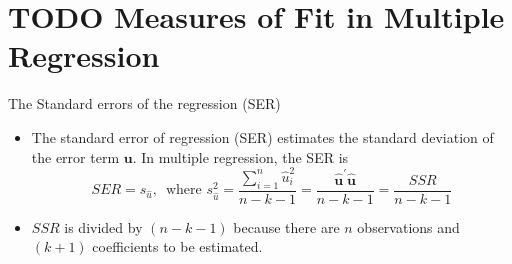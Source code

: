 \documentclass[presentation,10pt]{beamer}
\begin{document}
\section{{\bfseries\sffamily TODO} Measures of Fit in Multiple Regression}
\label{sec:org4a90111}
\setcounter{tocdepth}{1}
\tableofcontents[currentsection]

\begin{frame}[label={sec:orgbd3d8d8}]{The Standard errors of the regression (SER)}
\begin{itemize}
\item The standard error of regression (SER) estimates the standard deviation of the error term
\(\mathbf{u}\). In multiple regression, the SER is
\begin{equation}
\label{eq:ser-m}
SER = s_{\hat{u}},\, \text{ where } s^2_{\hat{u}} = \frac{\sum_{i=1}^n \hat{u}_i^2}{n-k-1} =\frac{\mathbf{\hat{u}}^{\prime} \mathbf{\hat{u}}}{n-k-1} = \frac{SSR}{n-k-1}
\end{equation}

\item \(SSR\) is divided by \((n-k-1)\) because there are \(n\) observations and
\((k+1)\) coefficients to be estimated.
\end{itemize}
\end{frame}
\end{document}
